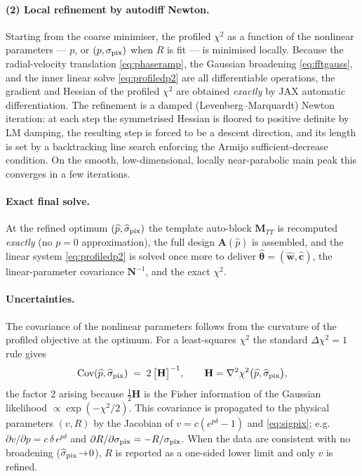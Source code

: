 \documentclass[11pt]{article}
\begin{document}
\paragraph{(2) Local refinement by autodiff Newton.}
Starting from the coarse minimiser, the profiled $\chi^2$ as a function of the
nonlinear parameters --- $p$, or $(p,\sigma_{\rm pix})$ when $R$ is fit --- is
minimised locally. Because the radial-velocity translation \eqref{eq:phaseramp},
the Gaussian broadening \eqref{eq:fftgauss}, and the inner linear solve
\eqref{eq:profiledp2} are all differentiable operations, the gradient and Hessian
of the profiled $\chi^2$ are obtained \emph{exactly} by JAX automatic
differentiation. The refinement is a damped (Levenberg--Marquardt) Newton
iteration: at each step the symmetrised Hessian is floored to positive definite by
LM damping, the resulting step is forced to be a descent direction, and its length
is set by a backtracking line search enforcing the Armijo sufficient-decrease
condition. On the smooth, low-dimensional, locally near-parabolic main peak this
converges in a few iterations.

\paragraph{Exact final solve.}
At the refined optimum $(\widehat p,\widehat\sigma_{\rm pix})$ the template
auto-block $\mathbf{M}_{TT}$ is recomputed \emph{exactly} (no $p=0$
approximation), the full design $\mathbf{A}(\widehat p)$ is assembled, and the
linear system \eqref{eq:profiledp2} is solved once more to deliver
$\widehat{\boldsymbol\theta}=(\widehat{\mathbf{w}},\widehat{\mathbf{c}})$, the
linear-parameter covariance $\mathbf{N}^{-1}$, and the exact $\chi^2$.

\paragraph{Uncertainties.}
The covariance of the nonlinear parameters follows from the curvature of the
profiled objective at the optimum. For a least-squares $\chi^2$ the standard
$\Delta\chi^2=1$ rule gives
\begin{equation}
  \operatorname{Cov}(\widehat p,\widehat\sigma_{\rm pix})
  \;=\; 2\,\big[\mathbf{H}\big]^{-1},
  \qquad
  \mathbf{H} = \nabla^2\chi^2\big(\widehat p,\widehat\sigma_{\rm pix}\big),
\end{equation}
the factor $2$ arising because $\tfrac12\mathbf{H}$ is the Fisher information of
the Gaussian likelihood $\propto\exp(-\chi^2/2)$. This covariance is propagated to
the physical parameters $(v,R)$ by the Jacobian of
$v=c(e^{p\delta}-1)$ and \eqref{eq:sigpix}; e.g.\ $\partial v/\partial p =
c\,\delta\,e^{p\delta}$ and $\partial R/\partial\sigma_{\rm pix} =
-R/\sigma_{\rm pix}$. When the data are consistent with no broadening
($\widehat\sigma_{\rm pix}\!\to\!0$), $R$ is reported as a one-sided lower limit
and only $v$ is refined.
\end{document}
